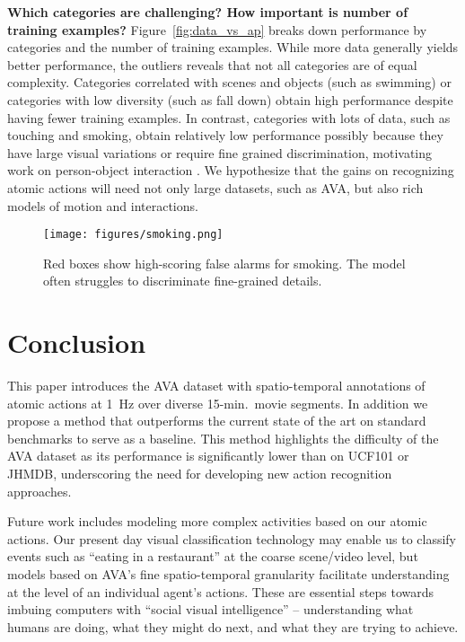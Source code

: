 \documentclass[10pt,twocolumn,letterpaper]{article}
\begin{document}
\noindent \textbf{Which categories are challenging? How important is number of training examples?}  Figure~\ref{fig:data_vs_ap} breaks down performance by categories and the number of training examples. While more data generally yields better performance, the outliers reveals that not all categories are of equal complexity. Categories correlated with scenes and objects (such as swimming) or categories with low diversity (such as fall down) obtain high performance despite having fewer training examples. In contrast, categories with lots of data, such as touching and smoking, obtain relatively low performance possibly because they have large visual variations or require fine grained discrimination, motivating work on person-object interaction \cite{hico2015,something_iccv17}. We hypothesize that the gains on recognizing atomic actions will need not only large datasets, such as AVA, but also rich models of motion and interactions.

\begin{figure}
    \centering
    \texttt{[image: figures/smoking.png]}
    \caption{Red boxes show high-scoring false alarms for smoking. The model often struggles to discriminate fine-grained details.}
    \label{fig:falsealarms}
    \vspace{-1em}
\end{figure} 
\vspace{-1mm}
\section{Conclusion}
\label{sec:conclusion}

This paper introduces the AVA dataset with spatio-temporal annotations of atomic actions at 1~Hz over diverse 15-min.\ movie segments. In addition we propose a method that outperforms the current state of the art on standard benchmarks to serve as a baseline. This method highlights the difficulty of the AVA dataset as its performance is significantly lower than on UCF101 or JHMDB, underscoring the need for developing new action recognition approaches.

Future work includes modeling more complex activities based on our atomic actions. Our present day visual classification technology may enable us to classify events such as ``eating in a restaurant'' at the coarse scene/video level, but models based on AVA's fine spatio-temporal granularity facilitate understanding at the level of an individual agent’s actions. These are essential steps towards imbuing computers with ``social visual intelligence'' -- understanding what humans are doing, what they might do next, and what they are trying to achieve.
 
\end{document}
